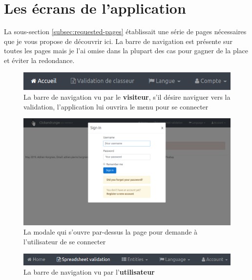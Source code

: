 \section{Les écrans de l'application}
\label{sec:pages-presentation}

La sous-section \ref{subsec:requested-pages} établissait une série de pages nécessaires que je vous propose de découvrir ici.
La barre de navigation est présente sur toutes les pages mais je l'ai omise dans la plupart des cas pour gagner de la place et éviter la redondance.

\begin{figure}[ht]
    \centering
    \includegraphics[width=1\textwidth]{images/screenshot/navbar-visitor.png}
    \caption{La barre de navigation vu par le \textbf{visiteur}, s'il désire naviguer vers la validation, l'application lui ouvrira le menu pour se connecter}
    \label{fig:navbar-visitor}
\end{figure}

\begin{figure}[ht]
    \centering
    \includegraphics[width=1\textwidth]{images/screenshot/login-modal.png}
    \caption{La modale qui s'ouvre par-dessus la page pour demande à l'utilisateur de se connecter}
    \label{fig:login-modal}
\end{figure}

\begin{figure}[ht]
    \centering
    \includegraphics[width=1\textwidth]{images/screenshot/navbar-user.png}
    \caption{La barre de navigation vu par l'\textbf{utilisateur}}
    \label{fig:navbar-user}
\end{figure}

